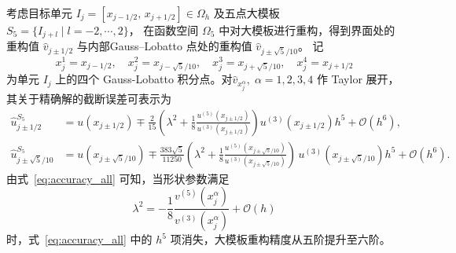 \documentclass[12pt,a4paper]{article}
\numberwithin{equation}{section}    %
\begin{document}
考虑目标单元 $I_j = [x_{j-1/2},\, x_{j+1/2}] \in \Omega_h$
及五点大模板 $S_5 = \{I_{j+l} \mid l = -2, \cdots, 2\}$，
在函数空间 $\Omega_5$ 中对大模板进行重构，得到界面处的重构值 $\hat{v}_{j\pm1/2}$ 与内部Gauss--Lobatto 点处的重构值 $\hat{v}_{j \pm \sqrt{5}/10}$。
记
\begin{equation}
    x^1_j = x_{j-1/2},\quad x^2_j = x_{j-\sqrt{5}/10},\quad x^3_j = x_{j+\sqrt{5}/10},\quad x^4_j = x_{j+1/2}
\end{equation}
为单元 $I_j$ 上的四个 Gauss-Lobatto 积分点。对$\hat{v}_{x^\alpha_j},\;\alpha = 1, 2, 3, 4$ 作 Taylor 展开，其关于精确解的截断误差可表示为
\begin{equation}
    \label{eq:accuracy_all}
    \begin{aligned}
        \hat{u}_{j\pm 1/2}^{S_5}
        &= u(x_{j\pm 1/2})
        \mp \frac{2}{15}
        \left(\lambda^2 + \frac{1}{8}\frac{u^{(5)}(x_{j\pm 1/2})}{u^{(3)}(x_{j\pm 1/2})}\right)u^{(3)}(x_{j\pm 1/2})h^5
        + \mathcal{O}(h^6), \\[6pt]
        \hat{u}_{j\pm\sqrt{5}/10}^{S_5}
        &= u(x_{j\pm\sqrt{5}/10})
        \mp \frac{383\sqrt{5}}{11250}
        \left(\lambda^2 + \frac{1}{8}\frac{u^{(5)}(x_{j\pm\sqrt{5}/10})}{u^{(3)}(x_{j\pm\sqrt{5}/10})}\right)\,u^{(3)}(x_{j\pm\sqrt{5}/10})h^5
        + \mathcal{O}(h^6).
    \end{aligned}
\end{equation}
由式~\eqref{eq:accuracy_all} 可知，当形状参数满足
\begin{equation}
    \label{eq:l2h2_condition}
    \lambda^2 = -\frac{1}{8}\frac{v^{(5)}(x_{j}^\alpha)}{v^{(3)}(x_{j}^\alpha)} + \mathcal{O}(h) 
\end{equation}
时，式~\eqref{eq:accuracy_all}  中的 $h^5$ 项消失，大模板重构精度从五阶提升至六阶。
\end{document}
